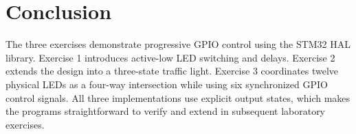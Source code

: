 \documentclass[a4paper]{article}
\begin{document}
\section{Conclusion}

The three exercises demonstrate progressive GPIO control using the STM32 HAL
library. Exercise 1 introduces active-low LED switching and delays. Exercise 2
extends the design into a three-state traffic light. Exercise 3 coordinates
twelve physical LEDs as a four-way intersection while using six synchronized
GPIO control signals. All three implementations use explicit output states,
which makes the programs straightforward to verify and extend in subsequent
laboratory exercises.
\end{document}
